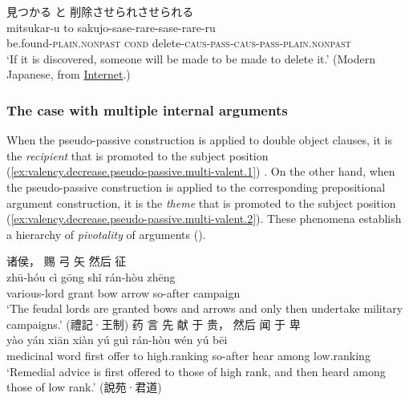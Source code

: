 \documentclass[UTF8, a4paper, oneside, scheme=plain, 12pt]{ctexrep}
\newcommand*{\citepage}[1]{p.~{#1}}
\newcommand*{\term}[1]{\emph{#1}}
\newcommand{\translate}[1]{`#1'}
\newcommand*{\category}[1]{\textsc{#1}}
\begin{document}
\begin{exe}
    \ex\label{ex:valency.passive.pseudo-passive.alternate-caus.japanese}
    \glll 見つかる と 削除させられさせられる \\
    mitsukar-u to sakujo-sase-rare-sase-rare-ru \\
    be.found-\category{plain}.\category{nonpast} \category{cond} delete-\category{caus}-\category{pass}-\category{caus}-\category{pass}-\category{plain}.\category{nonpast} \\
    \glt\translate{If it is discovered, someone will be made to be made to delete it.} (Modern Japanese, from \href{https://kuroisi.com/blog/2253.html}{Internet}.)
\end{exe}

\subsubsection{The case with multiple internal arguments}\label{sec:grammatical.clause.verbal.argument-structure.pseudo-passive.multiple-argument}

When the pseudo-passive construction is applied to double object clauses,
it is the \emph{recipient} that is promoted to the subject position 
(\ref{ex:valency.decrease.pseudo-passive.multi-valent.1}) \citep[\citepage{421}]{meiguang2018}.
On the other hand, when the pseudo-passive construction is applied to the corresponding prepositional argument construction,
it is the \emph{theme} that is promoted to the subject position
(\ref{ex:valency.decrease.pseudo-passive.multi-valent.2}).
These phenomena establish a hierarchy of \term{pivotality} of arguments ().

\begin{exe}
    \ex\label{ex:valency.decrease.pseudo-passive.multi-valent.1}
    \glll 诸侯， 赐 弓 矢 然后 征 \\
    zhū-hóu cì gōng shǐ rán-hòu zhēng \\
    various-lord grant bow arrow so-after campaign \\
    \glt\translate{The feudal lords are granted bows and arrows and only then undertake military campaigns.} \hfill (禮記·王制)
    \ex\label{ex:valency.decrease.pseudo-passive.multi-valent.2}
    \glll 药 言 先 献 于 贵， 然后 闻 于 卑 \\
    yào yán xiān xiàn yú guì rán-hòu wén yú bēi \\
    medicinal word first offer to high.ranking so-after hear among low.ranking \\
    \glt\translate{Remedial advice is first offered to those of high rank, and then heard among those of low rank.} \hfill (說苑·君道)
\end{exe}
\end{document}

